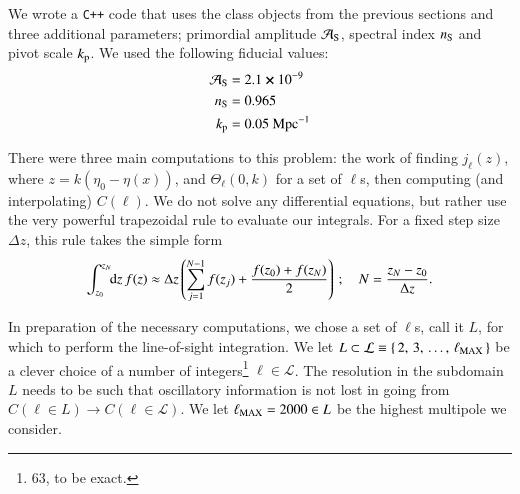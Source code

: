 




We wrote a \verb|C++| code that uses the class objects from the previous sections and three additional parameters; primordial amplitude $\mathcal{A}_\mathrm{S}$, spectral index $n_\mathrm{S}$ and pivot scale $k_\mathrm{p}$. We used the following fiducial values:
\begin{equation}
\begin{split}
    \mathcal{A}_\mathrm{S}  &=  2.1\cross 10^{-9}   \\
    n_\mathrm{S}            &=  0.965               \\
    k_\mathrm{p}            &=  0.05~\mathrm{Mpc^{-1}}
\end{split}
\end{equation}


There were three main computations to this problem: the work of finding $j_\ell(z)$, where $z= k(\eta_0-\eta(x))$, and $\Theta_\ell(0,k)$ for a set of $\ell$s, then computing (and interpolating) $C(\ell)$.
We do not solve any differential equations, but rather use the very powerful trapezoidal rule to evaluate our integrals. For a fixed step size $\Delta z$, this rule takes the simple form
\begin{equation}\label{mil4:imp:eq:trapezoidal_uniform}
    \int_{z_0}^{z_N} \!\!\mathop{}\!\mathrm{d} {z}\, f(z) \approx \Delta z \left( \sum_{j=1}^{N-1}f(z_j) + \frac{f(z_0) + f(z_{N})}{2} \right)\,; \quad N= \frac{z_N-z_0}{\Delta z}.
\end{equation}


In preparation of the necessary computations, we chose a set of $\ell$s, call it $L$, for which to perform the line-of-sight integration. We let $L\subset \mathcal{L}\equiv \{\,2,\,3,\, \dots,\,  \ell_\mathrm{MAX}\,\}$ be a clever choice of a number of integers\footnote{63, to be exact.} $\ell\in \mathcal{L}$. The resolution in the subdomain $L$ needs to be such that oscillatory information is not lost in going from $C(\ell\in L)\to C(\ell\in\mathcal{L})$. We let $\ell_\mathrm{MAX}=2000 \in L$ be the highest multipole we consider. 

